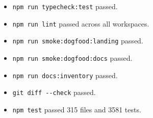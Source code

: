 \begin{itemize}
\begin{CodeBlock}
npm test -- --run scripts/docs-preview.test.ts packages/bijou-node/src/index.test.ts packages/bijou-tui/src/pipeline/pipeline.test.ts packages/bijou-tui/src/eventbus.test.ts scripts/check-node-version.test.ts
\end{CodeBlock}
\item
  \texttt{n\allowbreak{}p\allowbreak{}m\allowbreak{} \allowbreak{}r\allowbreak{}u\allowbreak{}n\allowbreak{} \allowbreak{}t\allowbreak{}y\allowbreak{}p\allowbreak{}e\allowbreak{}c\allowbreak{}h\allowbreak{}e\allowbreak{}c\allowbreak{}k\allowbreak{}:\allowbreak{}t\allowbreak{}e\allowbreak{}s\allowbreak{}t} passed.
\item
  \texttt{n\allowbreak{}p\allowbreak{}m\allowbreak{} \allowbreak{}r\allowbreak{}u\allowbreak{}n\allowbreak{} \allowbreak{}l\allowbreak{}i\allowbreak{}n\allowbreak{}t} passed across all workspaces.
\item
  \texttt{n\allowbreak{}p\allowbreak{}m\allowbreak{} \allowbreak{}r\allowbreak{}u\allowbreak{}n\allowbreak{} \allowbreak{}s\allowbreak{}m\allowbreak{}o\allowbreak{}k\allowbreak{}e\allowbreak{}:\allowbreak{}d\allowbreak{}o\allowbreak{}g\allowbreak{}f\allowbreak{}o\allowbreak{}o\allowbreak{}d\allowbreak{}:\allowbreak{}l\allowbreak{}a\allowbreak{}n\allowbreak{}d\allowbreak{}i\allowbreak{}n\allowbreak{}g} passed.
\item
  \texttt{n\allowbreak{}p\allowbreak{}m\allowbreak{} \allowbreak{}r\allowbreak{}u\allowbreak{}n\allowbreak{} \allowbreak{}s\allowbreak{}m\allowbreak{}o\allowbreak{}k\allowbreak{}e\allowbreak{}:\allowbreak{}d\allowbreak{}o\allowbreak{}g\allowbreak{}f\allowbreak{}o\allowbreak{}o\allowbreak{}d\allowbreak{}:\allowbreak{}d\allowbreak{}o\allowbreak{}c\allowbreak{}s} passed.
\item
  \texttt{n\allowbreak{}p\allowbreak{}m\allowbreak{} \allowbreak{}r\allowbreak{}u\allowbreak{}n\allowbreak{} \allowbreak{}d\allowbreak{}o\allowbreak{}c\allowbreak{}s\allowbreak{}:\allowbreak{}i\allowbreak{}n\allowbreak{}v\allowbreak{}e\allowbreak{}n\allowbreak{}t\allowbreak{}o\allowbreak{}r\allowbreak{}y} passed.
\item
  \texttt{g\allowbreak{}i\allowbreak{}t\allowbreak{} \allowbreak{}d\allowbreak{}i\allowbreak{}f\allowbreak{}f\allowbreak{} \allowbreak{}-\allowbreak{}-\allowbreak{}c\allowbreak{}h\allowbreak{}e\allowbreak{}c\allowbreak{}k} passed.
\item
  \texttt{n\allowbreak{}p\allowbreak{}m\allowbreak{} \allowbreak{}t\allowbreak{}e\allowbreak{}s\allowbreak{}t} passed 315 files and 3581 tests.

\end{itemize}
